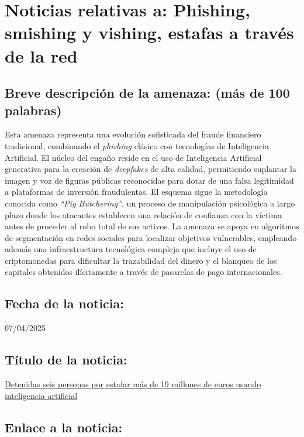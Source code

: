 \chapter{Noticias relativas a: Phishing, smishing y vishing, estafas a través de la red}


    \section{Breve descripción de la amenaza: (más de 100 palabras)}
    Esta amenaza representa una evolución sofisticada del fraude financiero tradicional, 
    combinando el \textit{phishing} clásico con tecnologías de Inteligencia Artificial.
     El núcleo del engaño reside en el uso de Inteligencia Artificial generativa para la 
     creación de \textit{deepfakes} de alta calidad, permitiendo suplantar la imagen y 
     voz de figuras públicas reconocidas para dotar de una falsa legitimidad a 
     plataformas de inversión fraudulentas. El esquema sigue la metodología conocida como 
     \textit{``Pig Butchering''}, un proceso de manipulación psicológica a 
     largo plazo donde los atacantes establecen una relación de confianza con la víctima 
     antes de proceder al robo total de sus activos. La amenaza se apoya en algoritmos 
     de segmentación en redes sociales para localizar objetivos vulnerables, 
     empleando además una infraestructura tecnológica compleja que incluye el uso de 
     criptomonedas para dificultar la trazabilidad del dinero y el blanqueo de los capitales 
     obtenidos ilícitamente a través de pasarelas de pago internacionales.


    \section{Fecha de la noticia:}

    07/04/2025

    \section{Título de la noticia:}
  
    \href{https://www.interior.gob.es/opencms/es/detalle/articulo/Detenidas-seis-personas-por-estafar-mas-de-19-millones-de-euros-usando-inteligencia-artificial/}{Detenidas seis personas por estafar más de 19 millones de euros usando inteligencia artificial}

    \section{Enlace a la noticia:}


